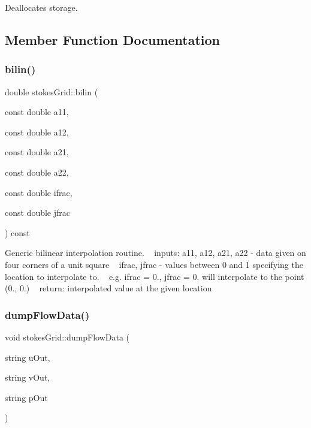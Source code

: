 Deallocates storage. 

\subsection{Member Function Documentation}
\mbox{\label{classstokesGrid_ac2afbf908d608b2e274ca87be9c81853}} 
\subsubsection{\texorpdfstring{bilin()}{bilin()}}
{\footnotesize\ttfamily double stokes\+Grid\+::bilin (\begin{DoxyParamCaption}\item[{const double}]{a11,  }\item[{const double}]{a12,  }\item[{const double}]{a21,  }\item[{const double}]{a22,  }\item[{const double}]{ifrac,  }\item[{const double}]{jfrac }\end{DoxyParamCaption}) const}

Generic bilinear interpolation routine. ~\newline
inputs\+: a11, a12, a21, a22 -\/ data given on four corners of a unit square ~\newline
ifrac, jfrac -\/ values between 0 and 1 specifying the location to interpolate to. ~\newline
e.\+g. ifrac = 0., jfrac = 0. will interpolate to the point (0., 0.) ~\newline
return\+: interpolated value at the given location \mbox{\label{classstokesGrid_a3ae2f8e65e54c35445d55baa3d61dda3}} 
\subsubsection{\texorpdfstring{dump\+Flow\+Data()}{dumpFlowData()}}
{\footnotesize\ttfamily void stokes\+Grid\+::dump\+Flow\+Data (\begin{DoxyParamCaption}\item[{string}]{u\+Out,  }\item[{string}]{v\+Out,  }\item[{string}]{p\+Out }\end{DoxyParamCaption})}

